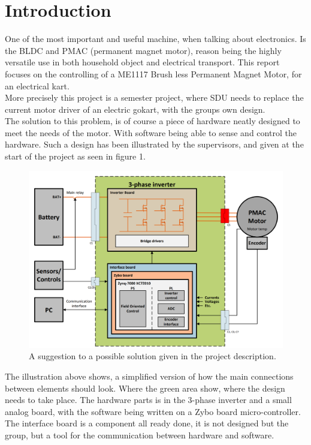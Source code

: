 \section{Introduction}
One of the most important and useful machine, when talking about electronics. Is the BLDC and PMAC (permanent magnet motor), reason being the highly versatile use in both household object and electrical transport. This report focuses on the controlling of a ME1117 Brush less Permanent Magnet Motor, for an electrical kart. \\

More precisely this project is a semester project, where SDU needs to replace the current motor driver of an electric gokart, with the groups own design. \\

The solution to this problem, is of course a piece of hardware neatly designed to meet the needs of the motor. With software being able to sense and control the hardware. Such a design has been illustrated by the supervisors, and given at the start of the project as seen in figure 1. \\

\begin{figure} [H]
  \centering
  \includegraphics[width=\linewidth]{pictures/general/Project1.PNG}
  \caption{A suggestion to a possible solution given in the project description. \cite{Project 1. semester - S19}}
  \label{fig:Possiblesolution}
\end{figure}

The illustration above shows, a simplified version of how the main connections between elements should look. Where the green area show, where the design needs to take place. The hardware parts is in the 3-phase inverter and a small analog board, with the software being written on a Zybo board micro-controller. The interface board is a component all ready done, it is not designed but the group, but a tool for the communication between hardware and software.

